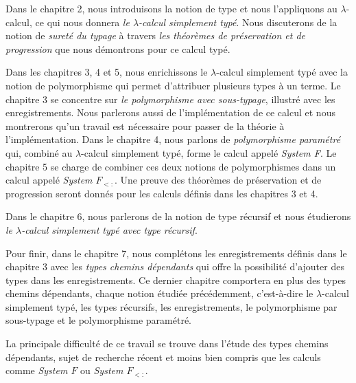 Dans le chapitre 2, nous introduisons la notion de type et nous l'appliquons au
$\lambda$-calcul, ce qui nous donnera \textit{le $\lambda$-calcul simplement typé}. Nous
discuterons de la notion de \textit{sureté du typage} à travers \textit{les théorèmes
de préservation et de progression} que nous démontrons pour ce calcul typé.

Dans les chapitres 3, 4 et 5, nous enrichissons le $\lambda$-calcul simplement
typé avec la notion de polymorphisme qui permet d'attribuer plusieurs types à un
terme. Le chapitre 3 se concentre sur \textit{le polymorphisme avec sous-typage},
illustré avec les enregistrements. Nous parlerons aussi de l'implémentation de
ce calcul et nous montrerons qu'un travail est nécessaire pour passer de la
théorie à l'implémentation.
Dans le chapitre 4, nous parlons de
\textit{polymorphisme paramétré} qui, combiné au $\lambda$-calcul simplement typé, forme
le calcul appelé \textit{System F}.
Le chapitre 5 se charge de combiner ces deux notions de polymorphismes dans un
calcul appelé \textit{System $F_{<:}$}.
Une preuve des théorèmes de préservation et de progression seront donnés pour
les calculs définis dans les chapitres 3 et 4.

Dans le chapitre 6, nous parlerons de la notion de type récursif et nous
étudierons \textit{le $\lambda$-calcul simplement typé avec type récursif}.

Pour finir, dans le chapitre 7, nous complétons les enregistrements définis
dans le chapitre 3 avec les \textit{types chemins dépendants} qui offre la possibilité
d'ajouter des types dans les enregistrements. Ce dernier chapitre comportera en
plus des types chemins dépendants, chaque notion étudiée précédemment,
c'est-à-dire le $\lambda$-calcul simplement typé, les types récursifs, les
enregistrements, le polymorphisme par sous-typage et le polymorphisme paramétré.

La principale difficulté de ce travail se trouve dans l'étude des types
chemins dépendants, sujet de recherche récent et moins bien compris que les
calculs comme \textit{System $F$} ou \textit{System $F_{<:}$}.

